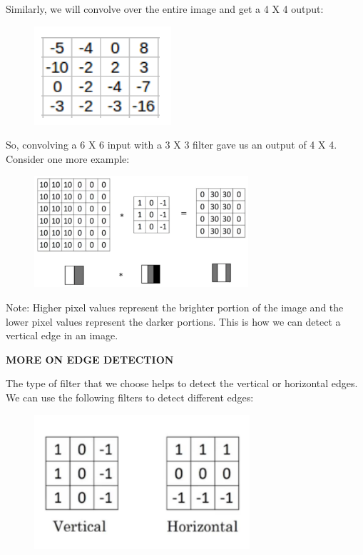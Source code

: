 \documentclass[a4paper]{article}
\begin{document}
Similarly, we will convolve over the entire image and get a 4 X 4 output: 
{
\begin{figure}[htp]
    \centering
    \includegraphics{f1_m.png}
\end{figure}
}


\clearpage

So, convolving a 6 X 6 input with a 3 X 3 filter gave us an output of 4 X 4. Consider one more example: 

{
\begin{figure}[htp]
    \centering
    \includegraphics[width=300]{Final_output.png}
\end{figure}
}
Note: Higher pixel values represent the brighter portion of the image and the lower pixel values represent the darker portions. This is how we can detect a vertical edge in an image.

\textbf{MORE ON EDGE DETECTION}

The type of filter that we choose helps to detect the vertical or horizontal edges. We can use the following filters to detect different edges: 

{
\begin{figure}[htp]
    \centering
    \includegraphics[width=8cm]{V_H_matrix.png}
\end{figure}
}
\end{document}
